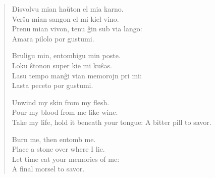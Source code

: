 \begin{verse}
    Disvolvu mian haŭton el mia karno.\\
    Verŝu mian sangon el mi kiel vino.\\
    Prenu mian vivon, tenu ĝin sub via lango:\\
    \vin Amara pilolo por gustumi.

    Bruligu min, entombigu min poste.\\
    Loku ŝtonon super kie mi kuŝas.\\
    Lasu tempo manĝi vian memorojn pri mi:\\
    \vin Lasta peceto por gustumi.

    \secdiv

    Unwind my skin from my flesh.\\
    Pour my blood from me like wine.\\
    Take my life, hold it beneath your tongue:
    \vin A bitter pill to savor.

    Burn me, then entomb me.\\
    Place a stone over where I lie.\\
    Let time eat your memories of me:\\
    \vin A final morsel to savor.
\end{verse}
